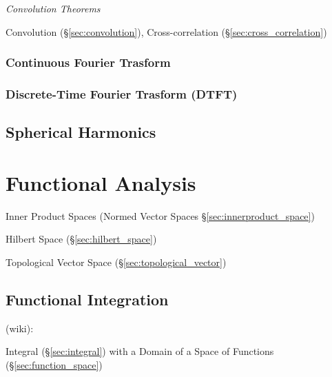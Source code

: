 \emph{Convolution Theorems}

Convolution (\S\ref{sec:convolution}), Cross-correlation
(\S\ref{sec:cross_correlation})



\subsubsection{Continuous Fourier Trasform}
\label{sec:continuous_fourier_transform}

\subsubsection{Discrete-Time Fourier Trasform (DTFT)}\label{sec:dtft}



\subsection{Spherical Harmonics}\label{sec:spherical_harmonics}



\section{Functional Analysis}\label{sec:functional_analysis}

Inner Product Spaces (Normed Vector Spaces
\S\ref{sec:innerproduct_space})

Hilbert Space (\S\ref{sec:hilbert_space})

Topological Vector Space (\S\ref{sec:topological_vector})



\subsection{Functional Integration}\label{sec:functional_integration}

(wiki):

Integral (\S\ref{sec:integral}) with a Domain of a Space of Functions
(\S\ref{sec:function_space})

